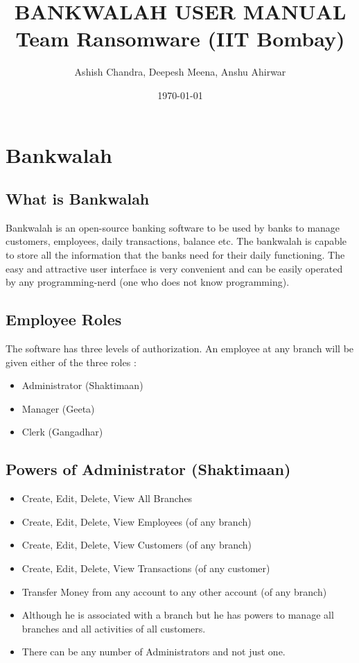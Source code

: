 \documentclass{article}
\title{\textbf{BANKWALAH USER MANUAL \\
Team Ransomware (IIT Bombay)}}
\author{Ashish Chandra, Deepesh Meena, Anshu Ahirwar}
\date{\small{\today}}
\begin{document}
\maketitle
\thispagestyle{empty}
\pagebreak

\tableofcontents

\pagebreak
\section{Bankwalah}
\subsection{What is Bankwalah}
Bankwalah is an open-source banking software to be used by banks to manage customers, employees, daily transactions, balance etc. The bankwalah is capable to store all the information that the banks need for their daily functioning. The easy and attractive user interface is very convenient and can be easily operated by any programming-nerd (one who does not know programming).

\subsection{Employee Roles}
The software has three levels of authorization. An employee at any branch will be given either of the three roles :
 \begin{itemize}
 \item Administrator (Shaktimaan)
 \item Manager (Geeta)
 \item Clerk (Gangadhar)
 \end{itemize}

\subsection{Powers of Administrator (Shaktimaan)}
 \begin{itemize}
 \item Create, Edit, Delete, View All Branches
 \item Create, Edit, Delete, View Employees (of any branch)
 \item Create, Edit, Delete, View Customers (of any branch)
 \item Create, Edit, Delete, View Transactions (of any customer)
 \item Transfer Money from any account to any other account (of any branch)
 \item Although he is associated with a branch but he has powers to manage all branches and all activities of all customers.
 \item There can be any number of Administrators and not just one.
 \end{itemize}
 
\end{document}
